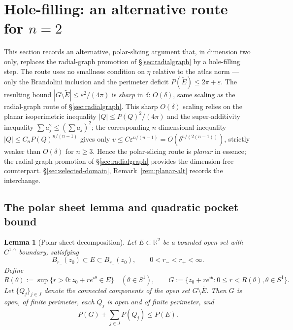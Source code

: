 \documentclass[11pt]{amsart}
\newtheorem{lemma}[theorem]{Lemma}
\newcommand{\R}{\mathbb R}
\newcommand{\eps}{\varepsilon}
\newcommand{\Etil}{\widetilde E}
\begin{document}
\section{Hole-filling: an alternative route for $n=2$}
\label{sec:hole-fill}

This section records an alternative, polar-slicing argument that, in
dimension two only, replaces the radial-graph promotion of
\S\ref{sec:radialgraph} by a hole-filling step.  The route uses no
smallness condition on \(\eta\) relative to the atlas norm — only the
Brandolini inclusion and the perimeter deficit
\(P(\Etil)\le 2\pi+\eps\).  The resulting bound
\(|G\setminus\Etil|\le\eps^{2}/(4\pi)\) is \emph{sharp} in
\(\delta\): \(O(\delta)\), same scaling as the radial-graph route
of \S\ref{sec:radialgraph}.  This sharp \(O(\delta)\) scaling
relies on the planar isoperimetric inequality
\(|Q|\le P(Q)^{2}/(4\pi)\) and the super-additivity inequality
\(\sum a_j^{2}\le(\sum a_j)^{2}\); the corresponding \(n\)-dimensional
inequality \(|Q|\le C_n P(Q)^{n/(n-1)}\) gives only
\(v\le C\eps^{n/(n-1)}=O(\delta^{n/(2(n-1))})\), strictly weaker than
\(O(\delta)\) for \(n\ge 3\).  Hence the polar-slicing route is
\emph{planar} in essence; the radial-graph promotion of
\S\ref{sec:radialgraph} provides the dimension-free counterpart.
\S\ref{sec:selected-domain}, Remark~\ref{rem:planar-alt} records the
interchange.

\subsection{The polar sheet lemma and quadratic pocket bound}

\begin{lemma}[Polar sheet decomposition]\label{lem:hull-decomp}
Let \(E\subset\R^2\) be a bounded open set with \(C^{1,\gamma}\) boundary,
satisfying
\begin{equation}\label{eq:core}
   B_{r_-}(z_0)\subset E\subset B_{r_+}(z_0),
   \qquad
   0<r_-<r_+<\infty.
\end{equation}
Define
\[
   R(\theta):=\sup\{r>0:z_0+r e^{i\theta}\in E\}\quad(\theta\in S^1),
   \qquad
   G:=\bigl\{z_0+re^{i\theta}:0\le r<R(\theta),\theta\in S^1\bigr\}.
\]
Let \(\{Q_j\}_{j\in J}\) denote the connected components of the open
set \(G\setminus\overline E\).  Then \(G\) is open, of finite perimeter,
each \(Q_j\) is open and of finite perimeter, and
\begin{equation}\label{eq:hull-decomp}
   P(G)+\sum_{j\in J}P(Q_j)\le P(E).
\end{equation}
\end{lemma}
\end{document}
